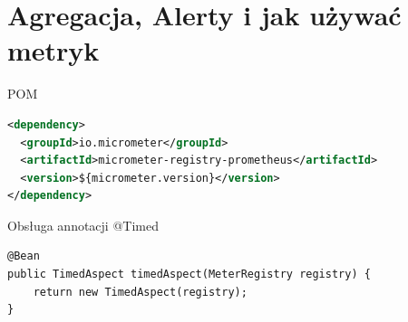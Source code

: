 \documentclass[epic,eepic,aspectratio=169,12pt]{beamer}
\begin{document}
\section{Agregacja, Alerty i jak używać metryk}
\begin{frame}[fragile]{POM}
	\begin{lstlisting}[language=XML]
<dependency>
  <groupId>io.micrometer</groupId>
  <artifactId>micrometer-registry-prometheus</artifactId>
  <version>${micrometer.version}</version>
</dependency>
	\end{lstlisting}
\end{frame}
\begin{frame}[fragile]{Obsługa annotacji @Timed}
		\begin{lstlisting}
@Bean
public TimedAspect timedAspect(MeterRegistry registry) {
	return new TimedAspect(registry);
}
		\end{lstlisting}
\end{frame}
\end{document}
